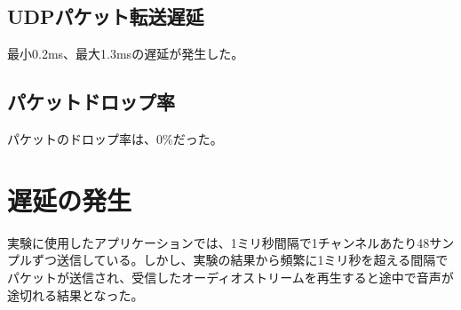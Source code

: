 \subsection{UDPパケット転送遅延}

最小0.2ms、最大1.3msの遅延が発生した。

\subsection{パケットドロップ率}

パケットのドロップ率は、0\%だった。

\section{遅延の発生}
\label{sec:evaluation_latency}

実験に使用したアプリケーションでは、1ミリ秒間隔で1チャンネルあたり48サンプルずつ送信している。しかし、実験の結果から頻繁に1ミリ秒を超える間隔でパケットが送信され、受信したオーディオストリームを再生すると途中で音声が途切れる結果となった。
